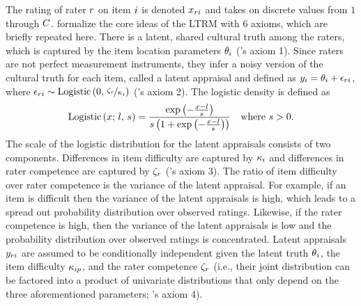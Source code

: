 \documentclass[a4paper,usenames,dvipsnames]{article}
\newcommand{\MR}	[1] 	{}%
\begin{document}
The rating of rater $r$ on item $i$ is denoted $x_{ri}$ and takes on discrete values from $1$ through $\Tncat$. \AB{} formalize the core ideas of the LTRM with 6 axioms, which are briefly repeated here. There is a latent, shared cultural truth among the raters, which is captured by the item location parameters $\theta_i$ (\AB{}'s axiom 1). Since raters are not perfect measurement instruments, they infer a noisy version of the cultural truth for each item, called a latent appraisal and defined as $y_{i} = \theta_i + \epsilon_{ri}$, where $\epsilon_{ri}\sim \text{Logistic}\left(0,\,\nicefrac{\zeta_r}{\kappa_i}\right)$ (\AB{}'s axiom 2). The logistic density is defined as
\begin{align*}
	\text{Logistic}\left(x;\,l,\,s\right) = \frac{\exp\left(-\frac{x - l}{s}\right)}{s\left(1 + \exp\left(-\frac{x - l}{s}\right)\right)}
	\quad \text{where $s > 0$}.
\end{align*}
The scale of the logistic distribution for the latent appraisals consists of two components. Differences in item difficulty are captured by $\kappa_i$ and differences in rater competence are captured by $\zeta_r$ (\AB{}'s axiom 3). The ratio of item difficulty over rater competence is the variance of the latent appraisal. For example, if an item is difficult then the variance of the latent appraisals is high, which leads to a spread out probability distribution over observed ratings. Likewise, if the rater competence is high, then the variance of the latent appraisals is low and the probability distribution over observed ratings is concentrated. 
Latent appraisals $y_{ri}$ are assumed to be conditionally independent given the latent truth $\theta{}_i$, the item difficulty $\kappa_{ip}$, and the rater competence $\zeta_r$ (i.e., their joint distribution can be factored into a product of univariate distributions that only depend on the three aforementioned parameters; \AB{}'s axiom 4). %
\end{document}
